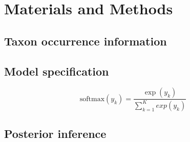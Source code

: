 \documentclass[12pt,letterpaper]{article}
\begin{document}
\section{Materials and Methods}

\subsection{Taxon occurrence information}



\subsection{Model specification}


\begin{equation}
  \mathrm{softmax}(y_k) = \frac{\exp(y_k)}{\sum_{k = 1}^{K} exp(y_{k})}
  \label{eq:softmax}
\end{equation}




\subsection{Posterior inference}


\end{document}

